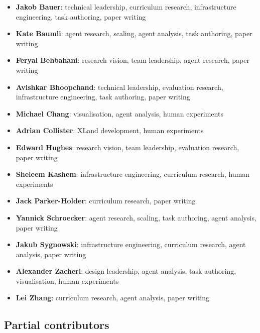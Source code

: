 \documentclass[11pt, a4paper, logo, copyright]{deepmind}
\begin{document}
\begin{itemize}
    \item \textbf{Jakob Bauer}: technical leadership, curriculum research, infrastructure engineering, task authoring, paper writing
    \item \textbf{Kate Baumli}: agent research, scaling, agent analysis, task authoring, paper writing
    \item \textbf{Feryal Behbahani}: research vision, team leadership, agent research, paper writing
    \item \textbf{Avishkar Bhoopchand}: technical leadership, evaluation research, infrastructure engineering, task authoring, paper writing
    \item \textbf{Michael Chang}: visualisation, agent analysis, human experiments
    \item \textbf{Adrian Collister}: XLand development, human experiments
    \item \textbf{Edward Hughes}: research vision, team leadership, evaluation research, paper writing
    \item \textbf{Sheleem Kashem}: infrastructure engineering, curriculum research, human experiments 
    \item \textbf{Jack Parker-Holder}: curriculum research, paper writing
    \item \textbf{Yannick Schroecker}: agent research, scaling, task authoring, agent analysis, paper writing
    \item \textbf{Jakub Sygnowski}: infrastructure engineering, curriculum research, agent analysis, paper writing
    \item \textbf{Alexander Zacherl}: design leadership, agent analysis, task authoring, visualisation, human experiments
    \item \textbf{Lei Zhang}: curriculum research, agent analysis, paper writing
\end{itemize}

\subsection{Partial contributors}
\end{document}
